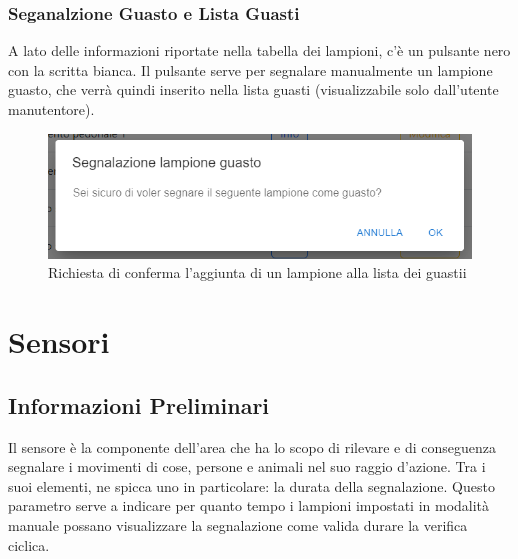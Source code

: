 \documentclass[a4paper, 12pt]{article}
\begin{document}
\subsubsection{Seganalzione Guasto e Lista Guasti}
A lato delle informazioni riportate nella tabella dei lampioni, c'è un pulsante nero con la scritta bianca. Il pulsante serve per segnalare manualmente un lampione guasto, che verrà quindi inserito nella lista guasti (visualizzabile solo dall'utente manutentore).
\begin{figure}[H]
\centering
\includegraphics[width=\textwidth]{ModaleGuastoLampione}
\caption{Richiesta di conferma l'aggiunta di un lampione alla lista dei guastii}
\end{figure}

\newpage
\section{Sensori}
\subsection{Informazioni Preliminari}
Il sensore è la componente dell'area che ha lo scopo di rilevare e di conseguenza segnalare i movimenti di cose, persone e animali nel suo raggio d'azione. Tra i suoi elementi, ne spicca uno in particolare: la durata della segnalazione. Questo parametro serve a indicare per quanto tempo i lampioni impostati in modalità manuale possano visualizzare la segnalazione come valida durare la verifica ciclica.
\end{document}
